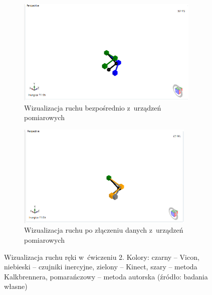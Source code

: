 \begin{savenotes}
	\begin{figure}[!htb]
		\captionsetup{singlelinecheck=off}
		\centering
		\begin{subfigure}[b]{\textwidth}
			\centering
			\includegraphics[width=\textwidth]{images/200/raw.png}	
			\caption{Wizualizacja ruchu bezpośrednio z~urządzeń pomiarowych}
			\label{fig:experiments:sec:raw}
		\end{subfigure}
																																									
		\begin{subfigure}[b]{\textwidth}
			\centering
			\includegraphics[width=\textwidth]{images/200/Fused.png}		
			\caption{Wizualizacja ruchu po złączeniu danych z~urządzeń pomiarowych}
			\label{fig:experiments:sec:fused}
		\end{subfigure}
																																								
		\caption[Wizualizacja ruchu ręki w~ćwiczeniu 2]{Wizualizacja ruchu ręki w~ćwiczeniu 2.  Kolory: czarny -- Vicon, niebieski -- czujniki inercyjne, zielony -- Kinect, szary -- metoda Kalkbrennera, pomarańczowy -- metoda autorska (źródło: badania własne)}	
		\label{fig:experiments:sec}
	\end{figure}
\end{savenotes}
